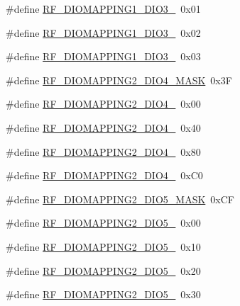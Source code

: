 \begin{DoxyCompactItemize}
\item 
\#define \mbox{\hyperlink{sx1276_regs-_fsk_8h_a04646c3e0ad7972da0c719126f656a91}{R\+F\+\_\+\+D\+I\+O\+M\+A\+P\+P\+I\+N\+G1\+\_\+\+D\+I\+O3\+\_}}~0x01
\item 
\#define \mbox{\hyperlink{sx1276_regs-_fsk_8h_a950ee75b1c397a6b2f06f2f7269471fe}{R\+F\+\_\+\+D\+I\+O\+M\+A\+P\+P\+I\+N\+G1\+\_\+\+D\+I\+O3\+\_}}~0x02
\item 
\#define \mbox{\hyperlink{sx1276_regs-_fsk_8h_a73c2510210ed9b4605d4fbbadc7e5ed1}{R\+F\+\_\+\+D\+I\+O\+M\+A\+P\+P\+I\+N\+G1\+\_\+\+D\+I\+O3\+\_}}~0x03
\item 
\#define \mbox{\hyperlink{sx1276_regs-_fsk_8h_a9415ebcccf7fd73e9c6e9de0b71a4be8}{R\+F\+\_\+\+D\+I\+O\+M\+A\+P\+P\+I\+N\+G2\+\_\+\+D\+I\+O4\+\_\+\+M\+A\+SK}}~0x3F
\item 
\#define \mbox{\hyperlink{sx1276_regs-_fsk_8h_a2c1e484d67c2b59da0b2b1f4de011000}{R\+F\+\_\+\+D\+I\+O\+M\+A\+P\+P\+I\+N\+G2\+\_\+\+D\+I\+O4\+\_}}~0x00
\item 
\#define \mbox{\hyperlink{sx1276_regs-_fsk_8h_a4ee426f706b74f90c0a6225669a87c6c}{R\+F\+\_\+\+D\+I\+O\+M\+A\+P\+P\+I\+N\+G2\+\_\+\+D\+I\+O4\+\_}}~0x40
\item 
\#define \mbox{\hyperlink{sx1276_regs-_fsk_8h_a6d6eff0baca6f8041d58b483f29c1477}{R\+F\+\_\+\+D\+I\+O\+M\+A\+P\+P\+I\+N\+G2\+\_\+\+D\+I\+O4\+\_}}~0x80
\item 
\#define \mbox{\hyperlink{sx1276_regs-_fsk_8h_a04ef85b93c2ee7e32c2992dbcf60781c}{R\+F\+\_\+\+D\+I\+O\+M\+A\+P\+P\+I\+N\+G2\+\_\+\+D\+I\+O4\+\_}}~0x\+C0
\item 
\#define \mbox{\hyperlink{sx1276_regs-_fsk_8h_a7f2fac07e30561cbe8a856d35592704e}{R\+F\+\_\+\+D\+I\+O\+M\+A\+P\+P\+I\+N\+G2\+\_\+\+D\+I\+O5\+\_\+\+M\+A\+SK}}~0x\+CF
\item 
\#define \mbox{\hyperlink{sx1276_regs-_fsk_8h_a49d9e03aef7b56e4772c7af5f55822b2}{R\+F\+\_\+\+D\+I\+O\+M\+A\+P\+P\+I\+N\+G2\+\_\+\+D\+I\+O5\+\_}}~0x00
\item 
\#define \mbox{\hyperlink{sx1276_regs-_fsk_8h_a3fa8da47f99319005e509c21a50e48b0}{R\+F\+\_\+\+D\+I\+O\+M\+A\+P\+P\+I\+N\+G2\+\_\+\+D\+I\+O5\+\_}}~0x10
\item 
\#define \mbox{\hyperlink{sx1276_regs-_fsk_8h_a259874b1f6f9963873c96de8b0bb6c30}{R\+F\+\_\+\+D\+I\+O\+M\+A\+P\+P\+I\+N\+G2\+\_\+\+D\+I\+O5\+\_}}~0x20
\item 
\#define \mbox{\hyperlink{sx1276_regs-_fsk_8h_ace7d0c4a788c6e13dd2ba438eb4ea344}{R\+F\+\_\+\+D\+I\+O\+M\+A\+P\+P\+I\+N\+G2\+\_\+\+D\+I\+O5\+\_}}~0x30

\end{DoxyCompactItemize}
